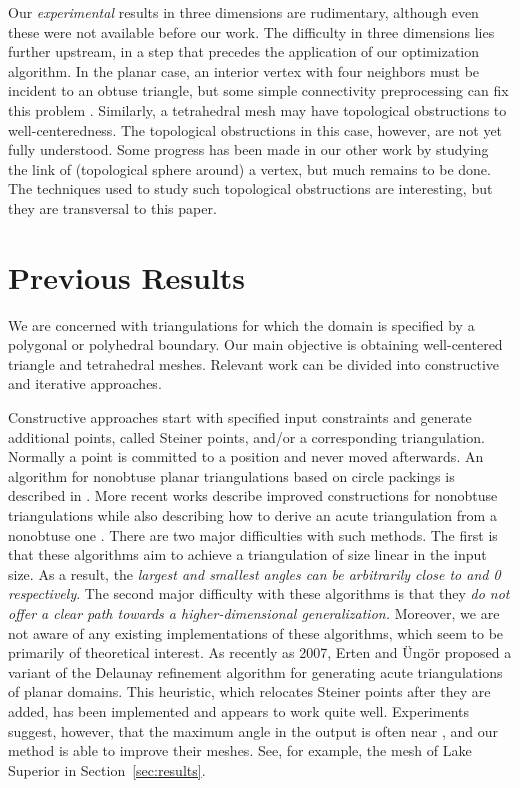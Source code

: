 \documentclass[final]{siamltex}
\begin{document}
Our \emph{experimental} results in three dimensions are rudimentary,
although even these
were not available before our work.  The difficulty in three
dimensions lies further upstream, in a step that precedes the
application of our optimization algorithm. In the planar case, an
interior vertex with four neighbors must be incident to an obtuse
triangle, but some simple connectivity preprocessing can fix this
problem \cite{VaHiGuRa2007}. Similarly, a tetrahedral mesh may have
topological obstructions to well-centeredness.  The topological
obstructions in this case, however, are not yet fully understood.
Some progress has been made in our other work \cite{VaHiGuRaZh2008} by
studying the link of (topological sphere around) a vertex, but much
remains to be done.  The techniques used to study such topological
obstructions are interesting, but they are transversal to this paper.


\section{Previous Results}
\label{sec:prevWork}
We are concerned with triangulations for which the domain is specified
by a polygonal or polyhedral boundary.  Our main objective is
obtaining well-centered triangle and tetrahedral meshes.  Relevant
work can be divided into constructive and iterative approaches.

Constructive approaches start with specified input constraints and
generate additional points, called Steiner points, and/or a
corresponding triangulation. Normally a point is committed to a
position and never moved afterwards. An algorithm for nonobtuse planar
triangulations based on circle packings is described in
\cite{BeMiRu1994}.  More recent works describe improved constructions
for nonobtuse triangulations while also describing how to derive an
acute triangulation from a nonobtuse one \cite{Maehara2002,
  Yuan2005}. There are two major difficulties with such
  methods. The first is that these algorithms aim to achieve a
  triangulation of size linear in the input size. As a result, the
  \emph{largest and smallest angles can be arbitrarily close to
     and 0 respectively}. The second major difficulty with
  these algorithms is that they \emph{do not offer a clear path
    towards a higher-dimensional generalization.} Moreover, we are
not aware of any existing implementations of these algorithms, which
seem to be primarily of theoretical interest.  As recently as 2007,
Erten and \"Ung\"or \cite{ErUn2007} proposed a variant of the Delaunay
refinement algorithm for generating acute triangulations of planar
domains.  This
heuristic, which relocates Steiner points after they
are added, has been implemented and appears to work quite well.
Experiments suggest, however, that the maximum angle in the output is
often near , and our method is able to improve their meshes.
See, for example, the mesh of Lake Superior in
Section~\ref{sec:results}.
\end{document}

